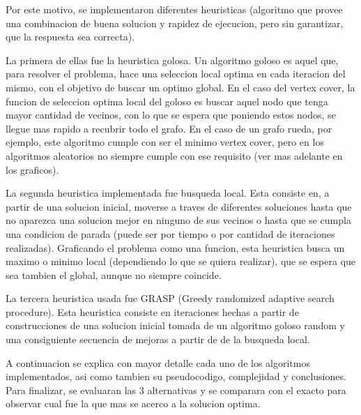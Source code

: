 Por este motivo, se implementaron diferentes heuristicas (algoritmo que provee una combinacion de buena solucion y rapidez de ejecucion, pero sin garantizar,
que la respuesta sea correcta).

La primera de ellas fue la heuristica golosa. Un algoritmo goloso es aquel que, para resolver el problema, hace una seleccion local optima en cada iteracion
del mismo, con el objetivo de buscar un optimo global.
En el caso del vertex cover, la funcion de seleccion optima local del goloso es buscar aquel nodo que tenga mayor cantidad de vecinos, con lo que se espera
que poniendo estos nodos, se llegue mas rapido a recubrir todo el grafo.
En el caso de un grafo rueda, por ejemplo, este algoritmo cumple con ser el minimo vertex cover, pero en los algoritmos aleatorios no siempre cumple con
ese requisito (ver mas adelante en los graficos).


La segunda heuristica implementada fue busqueda local. Esta consiste en, a partir de una solucion inicial, moverse a traves de diferentes soluciones hasta
que no aparezca una solucion mejor en ninguno de sus vecinos o hasta que se cumpla una condicion de parada (puede ser por tiempo o por cantidad de iteraciones
realizadas).
Graficando el problema como una funcion, esta heuristica busca un maximo o minimo local (dependiendo lo que se quiera realizar), que se espera que sea tambien
el global, aunque no siempre coincide.


La tercera heuristica usada fue GRASP (Greedy randomized adaptive search procedure). Esta heuristica consiste en iteraciones hechas a partir de  construcciones
de una solucion inicial tomada de un algoritmo goloso random y una consiguiente secuencia de mejoras a partir de de la busqueda local.


A continuacion se explica con mayor detalle cada uno de los algoritmos implementados, asi como tambien su pseudocodigo, complejidad y conclusiones.
Para finalizar, se evaluaran las 3 alternativas y se comparara con el exacto para observar cual fue la que mas se acerco a la solucion optima.
